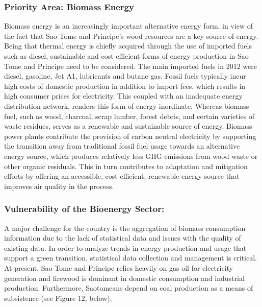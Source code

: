 \documentclass[
]{book}
\begin{document}
\hypertarget{priority-area-biomass-energy-1}{%
\subsubsection{Priority Area: Biomass Energy}\label{priority-area-biomass-energy-1}}

Biomass energy is an increasingly important alternative energy form, in view of the fact that Sao Tome and Principe's wood resources are a key source of energy. Being that thermal energy is chiefly acquired through the use of imported fuels such as diesel, sustainable and cost-efficient forms of energy production in Sao Tome and Principe need to be considered. The main imported fuels in 2012 were diesel, gasoline, Jet A1, lubricants and butane gas. Fossil fuels typically incur high costs of domestic production in addition to import fees, which results in high consumer prices for electricity. This coupled with an inadequate energy distribution network, renders this form of energy inordinate. Whereas biomass fuel, such as wood, charcoal, scrap lumber, forest debris, and certain varieties of waste residues, serves as a renewable and sustainable source of energy. Biomass power plants contribute the provision of carbon neutral electricity by supporting the transition away from traditional fossil fuel usage towards an alternative energy source, which produces relatively less GHG emissions from wood waste or other organic residuals. This in turn contributes to adaptation and mitigation efforts by offering an accessible, cost efficient, renewable energy source that improves air quality in the process.

\hypertarget{vulnerability-of-the-bioenergy-sector-1}{%
\subsubsection{Vulnerability of the Bioenergy Sector:}\label{vulnerability-of-the-bioenergy-sector-1}}

A major challenge for the country is the aggregation of biomass consumption information due to the lack of statistical data and issues with the quality of existing data. In order to analyze trends in energy production and usage that support a green transition, statistical data collection and management is critical. At present, Sao Tome and Principe relies heavily on gas oil for electricity generation and firewood is dominant in domestic consumption and industrial production. Furthermore, Saotomeans depend on coal production as a means of subsistence (see Figure 12, below).
\end{document}
